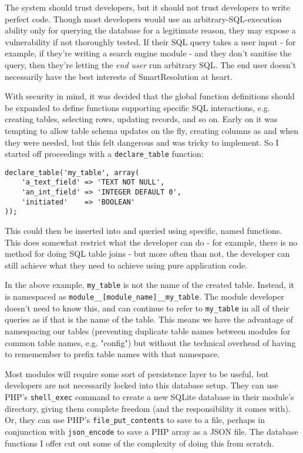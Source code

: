 The system should trust developers, but it should not trust developers to write perfect code. Though most developers would use an arbitrary-SQL-execution ability only for querying the database for a legitimate reason, they may expose a vulnerability if not thoroughly tested. If their SQL query takes a user input - for example, if they're writing a search engine module - and they don't sanitise the query, then they're letting the \emph{end user} run arbitrary SQL. The end user doesn't necessarily have the best interests of SmartResolution at heart.

With security in mind, it was decided that the global function definitions should be expanded to define functions supporting specific SQL interactions, e.g. creating tables, selecting rows, updating records, and so on. Early on it was tempting to allow table schema updates on the fly, creating columns as and when they were needed, but this felt dangerous and was tricky to implement. So I started off proceedings with a \lstinline{declare_table} function:

\begin{lstlisting}
declare_table('my_table', array(
    'a_text_field' => 'TEXT NOT NULL',
    'an_int_field' => 'INTEGER DEFAULT 0',
    'initiated'    => 'BOOLEAN'
));
\end{lstlisting}

This could then be inserted into and queried using specific, named functions. This does somewhat restrict what the developer can do - for example, there is no method for doing SQL table joins - but more often than not, the developer can still achieve what they need to achieve using pure application code.

In the above example, \lstinline{my_table} is not the name of the created table. Instead, it is namespaced as \lstinline{module__[module_name]__my_table}. The module developer doesn't need to know this, and can continue to refer to \lstinline{my_table} in all of their queries as if that is the name of the table. This means we have the advantage of namespacing our tables (preventing duplicate table names between modules for common table names, e.g. "config") but without the technical overhead of having to rememember to prefix table names with that namespace.

Most modules will require some sort of persistence layer to be useful, but developers are not necessarily locked into this database setup. They can use PHP's \lstinline{shell_exec} command to create a new SQLite database in their module's directory, giving them complete freedom (and the responsibility it comes with). Or, they can use PHP's \lstinline{file_put_contents} to save to a file, perhaps in conjunction with \lstinline{json_encode} to save a PHP array as a JSON file. The database functions I offer cut out some of the complexity of doing this from scratch.

